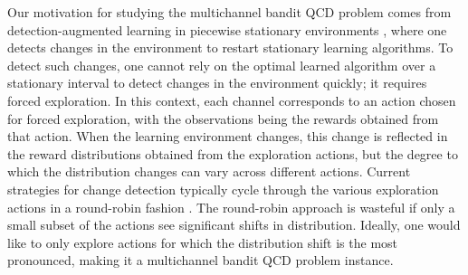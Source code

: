 \documentclass[letterpaper, 10 pt, conference]{ieeeconf}  %
\begin{document}

Our motivation for studying the multichannel bandit QCD problem comes from detection-augmented learning in piecewise stationary environments \cite{huang2025detection,gerogiannis2025detection}, where one detects changes in the environment to restart stationary  learning algorithms. To detect such changes, one cannot rely on the optimal learned algorithm over a stationary interval to detect changes in the environment quickly; it requires forced exploration. In this context, each channel  corresponds to an action chosen for forced exploration, with the observations being the rewards obtained from that action. When the learning environment changes, this change is reflected in the reward distributions obtained from the exploration actions, but the degree to which the distribution changes can vary  across different actions. Current strategies for change detection typically cycle through the various exploration actions in a round-robin fashion \cite{besson2022efficient,huang2025detection,gerogiannis2025detection}. The round-robin approach is wasteful if only a small subset of the actions see significant shifts in distribution. Ideally, one would like to only explore actions for which the distribution shift is the most pronounced, making it a multichannel bandit QCD problem instance.
\end{document}
